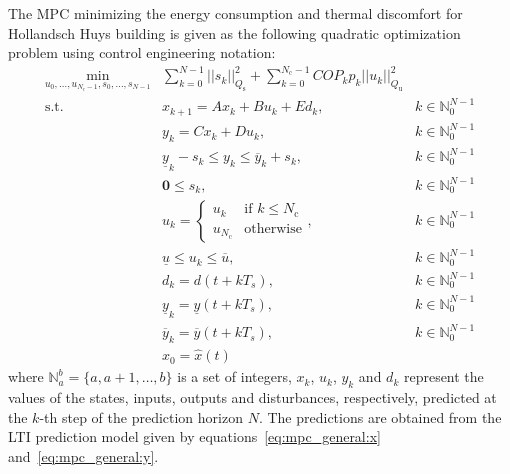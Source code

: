 \documentclass[10pt]{extarticle}
\begin{document}
The MPC minimizing  the energy consumption and  thermal discomfort 
for Hollandsch Huys building is given as the following quadratic optimization problem using control engineering notation:
\begin{subequations}
\label{eq:mpc_general}
\begin{align}
 \min_{u_0, \ldots, u_{N_{\text{c}}-1}, s_0, \ldots, s_{N-1}} & \sum_{k=0}^{N-1}  
 || s_k ||_{Q_\text{s}}^2 +  \sum_{k=0}^{N_{\text{c}}-1} COP_k p_k ||u_k ||_{Q_\text{u}}^2  &
 \label{eq:mpc_general:cost}\\
  \text{s.t.} \ & x_{k+1} = A x_k+ B u_k +E d_k, & k \in \mathbb{N}_{0}^{N-1} \label{eq:mpc_general:x} \\
  & y_{k} = C x_k + D u_k, & k \in \mathbb{N}_{0}^{N-1} \label{eq:mpc_general:y} \\
  & \underline{y}_k - s_k \le y_k \le \overline{y}_k + s_k, & k \in \mathbb{N}_{0}^{N-1} \label{eq:mpc_general:zone} \\
   & \mathbf{0} \le s_k  ,  & k \in \mathbb{N}_{0}^{N-1} \label{eq:mpc_general:lb_sk}\\
    & u_k =  \begin{cases}
    u_k & \text{if } k \leq N_{\text{c}}\\
   u_{N_{\text{c}}}     & \text{otherwise}   \end{cases}, & k \in \mathbb{N}_{0}^{N-1} \label{eq:mpc_general:move_block} \\
  & \underline{u} \le u_k \le \overline{u},  & k \in \mathbb{N}_{0}^{N-1} \label{eq:mpc_general:ub}\\
   & d_k = d(t+ k T_s), & k \in \mathbb{N}_{0}^{N-1} \label{eq:mpc_general:d0} \\
  & \underline{y}_k =  \underline{y}(t+ k T_s), & k \in \mathbb{N}_{0}^{N-1} \label{eq:mpc_general:r_low} \\
    & \overline{y}_k =  \overline{y}(t+ k T_s), & k \in \mathbb{N}_{0}^{N-1} \label{eq:mpc_general:r_up} \\
  & x_0 = \hat{x}(t) \label{eq:mpc_general:x0}
\end{align}
\end{subequations}
where $\mathbb{N}_a^b = \{a, a+1, \ldots, b \}$ is a set of integers,
$x_k$, $u_k$, $y_k$ and $d_k$ represent the values of the states, 
inputs, outputs and disturbances, respectively, 
predicted at the $k$-th step of the prediction horizon $N$.
The predictions are obtained from the LTI prediction
model given by equations~\eqref{eq:mpc_general:x} and~\eqref{eq:mpc_general:y}.
\end{document}
